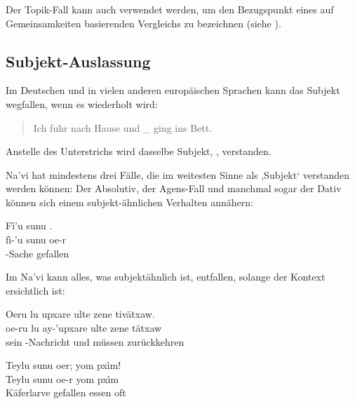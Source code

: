 \subsubsection{} Der Topik-Fall kann auch verwendet werden, um den Bezugspunkt eines auf Gemeinsamkeiten basierenden Vergleichs zu bezeichnen (siehe ).

\subsection{Subjekt-Auslassung} \label{subject-dropping}
Im Deutschen und in vielen anderen europäischen Sprachen kann das Subjekt wegfallen, wenn es wiederholt wird:

\begin{quotation}
	\noindent Ich fuhr nach Hause und \_ ging ins Bett.
\end{quotation}

\noindent Anstelle des Unterstrichs wird dasselbe Subjekt, , verstanden.

Na'vi hat mindestens drei Fälle, die im weitesten Sinne als ,Subjekt‘ verstanden werden können: Der Absolutiv, der Agens-Fall und manchmal sogar der Dativ können sich einem subjekt-ähnlichen Verhalten annähern:

\begin{interlin}
	\glll Fì'u sunu . \\
	fì-'u sunu oe-r \\
	-Sache gefallen  \\
\end{interlin}

\noindent Im Na'vi kann alles, was subjektähnlich ist, entfallen, solange der Kontext ersichtlich ist:

\begin{interlin} \label{omit:subject:ex01}
	\glll Oeru lu upxare ulte zene tivätxaw. \\
	oe-ru lu ay-'upxare ulte zene tätxaw \\
	 sein -Nachricht und müssen zurückkehren \\
\end{interlin}

\begin{interlin} \label{omit:subject:ex02}
	\glll Teylu sunu oer; yom pxìm! \\
	Teylu sunu oe-r yom pxìm \\
	Käferlarve gefallen  essen oft \\
\end{interlin}

